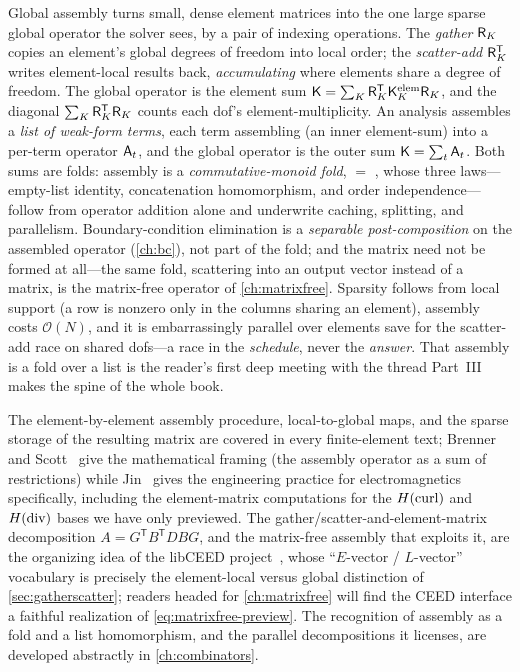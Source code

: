 \summarysection
Global assembly turns small, dense element matrices into the one large sparse
global operator the solver sees, by a pair of indexing operations. The
\emph{gather} $\mathsf{R}_K$ copies an element's global degrees of freedom into local
order; the \emph{scatter-add} $\mathsf{R}_K^{\mathsf T}$ writes element-local results
back, \emph{accumulating} where elements share a degree of freedom. The global
operator is the element sum $\mathsf{K}=\sum_K\mathsf{R}_K^{\mathsf
T}\mathsf{K}^{\mathrm{elem}}_K\mathsf{R}_K$, and the diagonal $\sum_K\mathsf{R}_K^{\mathsf
T}\mathsf{R}_K$ counts each dof's element-multiplicity. An analysis assembles a
\emph{list of weak-form terms}, each term assembling (an inner element-sum) into a
per-term operator $\mathsf{A}_t$, and the global operator is the outer sum
$\mathsf{K}=\sum_t\mathsf{A}_t$. Both sums are folds: assembly is a
\emph{commutative-monoid fold},  $=$ ,
whose three laws---empty-list identity, concatenation homomorphism, and order
independence---follow from operator addition alone and underwrite caching,
splitting, and parallelism. Boundary-condition elimination is a \emph{separable
post-composition} on the assembled operator (\cref{ch:bc}), not part of the fold;
and the matrix need not be formed at all---the same fold, scattering into an
output vector instead of a matrix, is the matrix-free operator of
\cref{ch:matrixfree}. Sparsity follows from local support (a row is nonzero only
in the columns sharing an element), assembly costs $\mathcal{O}(N)$, and it is
embarrassingly parallel over elements save for the scatter-add race on shared
dofs---a race in the \emph{schedule}, never the \emph{answer}. That assembly is a
fold over a list is the reader's first deep meeting with the thread Part~III makes
the spine of the whole book.

\furtherreading
The element-by-element assembly procedure, local-to-global maps, and the sparse
storage of the resulting matrix are covered in every finite-element text; Brenner
and Scott~\citep{brennerscott2008} give the mathematical framing (the assembly
operator as a sum of restrictions) while Jin~\citep{jin2014} gives the engineering
practice for electromagnetics specifically, including the element-matrix
computations for the $H(\mathrm{curl})$ and $H(\mathrm{div})$ bases we have only previewed. The
gather/scatter-and-element-matrix decomposition $A=G^{\mathsf
T}B^{\mathsf T}DBG$, and the matrix-free assembly that exploits it, are the
organizing idea of the libCEED project~\citep{ceed2021}, whose ``$E$-vector /
$L$-vector'' vocabulary is precisely the element-local versus global distinction
of \cref{sec:gatherscatter}; readers headed for \cref{ch:matrixfree} will find the
CEED interface a faithful realization of \cref{eq:matrixfree-preview}. The
recognition of assembly as a fold and a list homomorphism, and the parallel
decompositions it licenses, are developed abstractly in \cref{ch:combinators}.

